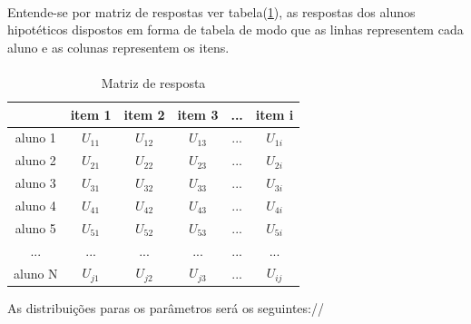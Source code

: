 	\paragraph{}
	    Entende-se por matriz de respostas ver tabela(\ref{tab:mat_resposta}), as respostas dos alunos hipotéticos dispostos em forma de tabela de modo que as linhas representem cada aluno e as colunas representem os itens.
	\paragraph{}
	    \begin{table}[!h]
	        \centering
	        \caption{Matriz de resposta}
	        \begin{tabular}{|c|c|c|c|c|c|}
	           \hline
	              & item 1 & item 2 & item 3 & ... & item i\\
	           \hline
	           \hline
	             aluno 1 & $U_{11}$ & $U_{12}$ & $U_{13}$ & ... & $U_{1i}$\\
	           \hline
	             aluno 2 & $U_{21}$& $U_{22}$ & $U_{23}$ & ... & $U_{2i}$\\
	           \hline
	             aluno 3 & $U_{31}$ & $U_{32}$ & $U_{33}$ & ... & $U_{3i}$\\
	           \hline
	             aluno 4 & $U_{41}$ & $U_{42}$ & $U_{43}$ & ... & $U_{4i}$\\
	           \hline
	             aluno 5 & $U_{51}$ & $U_{52}$ & $U_{53}$ & ... & $U_{5i}$\\
	           \hline
	               ...   & ... & ... & ... & ... & ...\\
	           \hline
	             aluno N & $U_{j1}$ & $U_{j2}$ & $U_{j3}$ & ... & $U_{ij}$\\
	           \hline
	        \end{tabular}
	        \label{tab:mat_resposta}
	    \end{table}
	   
	    \newpage
	     As distribuições paras os parâmetros será os seguintes://
	 
